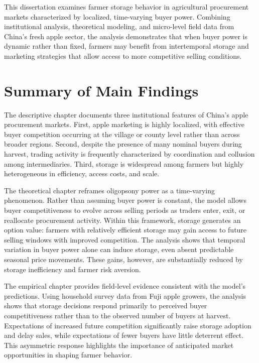\noindent
This dissertation examines farmer storage behavior in agricultural procurement markets characterized by localized, time-varying buyer power. Combining institutional analysis, theoretical modeling, and micro-level field data from China's fresh apple sector, the analysis demonstrates that when buyer power is dynamic rather than fixed, farmers may benefit from intertemporal storage and marketing strategies that allow access to more competitive selling conditions.

\section{Summary of Main Findings}
\noindent
The descriptive chapter documents three institutional features of China's apple procurement markets. First, apple marketing is highly localized, with effective buyer competition occurring at the village or county level rather than across broader regions. Second, despite the presence of many nominal buyers during harvest, trading activity is frequently characterized by coordination and collusion among intermediaries. Third, storage is widespread among farmers but highly heterogeneous in efficiency, access costs, and scale.

The theoretical chapter reframes oligopsony power as a time-varying phenomenon. Rather than assuming buyer power is constant, the model allows buyer competitiveness to evolve across selling periods as traders enter, exit, or reallocate procurement activity. Within this framework, storage generates an option value: farmers with relatively efficient storage may gain access to future selling windows with improved competition. The analysis shows that temporal variation in buyer power alone can induce storage, even absent predictable seasonal price movements. These gains, however, are substantially reduced by storage inefficiency and farmer risk aversion.

The empirical chapter provides field-level evidence consistent with the model's predictions. Using household survey data from Fuji apple growers, the analysis shows that storage decisions respond primarily to perceived buyer competitiveness rather than to the observed number of buyers at harvest. Expectations of increased future competition significantly raise storage adoption and delay sales, while expectations of fewer buyers have little deterrent effect. This asymmetric response highlights the importance of anticipated market opportunities in shaping farmer behavior.

